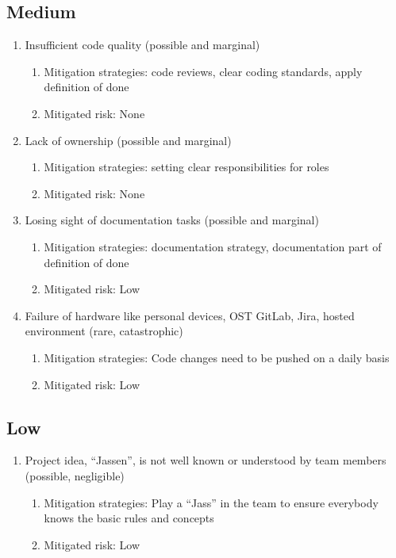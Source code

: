 \subsection{Medium}
\begin{enumerate}
    \item Insufficient code quality (possible and marginal) 
    \begin{enumerate}
        \item Mitigation strategies: code reviews, clear coding standards, apply definition of done
        \item Mitigated risk: None
    \end{enumerate}

    \item Lack of ownership (possible and marginal) 
    \begin{enumerate}
        \item Mitigation strategies: setting clear responsibilities for roles
        \item Mitigated risk: None
    \end{enumerate}

    \item Losing sight of documentation tasks (possible and marginal) 
    \begin{enumerate}
        \item Mitigation strategies: documentation strategy, documentation part of definition of done
        \item Mitigated risk: Low
    \end{enumerate}

    \item Failure of hardware like personal devices, OST GitLab, Jira, hosted environment (rare, catastrophic) 
    \begin{enumerate}
        \item Mitigation strategies: Code changes need to be pushed on a daily basis
        \item Mitigated risk: Low
    \end{enumerate}
\end{enumerate}

\subsection{Low}
\begin{enumerate}
    \item Project idea, ``Jassen'', is not well known or understood by team members (possible, negligible)
    \begin{enumerate}
        \item Mitigation strategies:  Play a ``Jass'' in the team to ensure everybody knows the basic rules and concepts
        \item Mitigated risk: Low
    \end{enumerate}
\end{enumerate}


